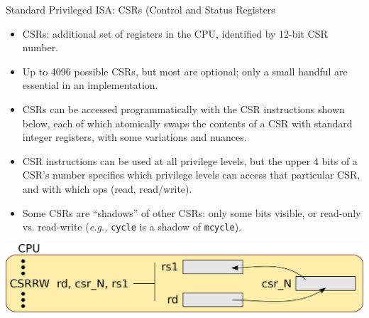 \documentclass{article}
\newcommand{\hm}{\hspace*{1em}}
\newcommand{\eg}{\emph{e.g.,}}
\begin{document}
\clearpage


\begin{center}
  {\Huge
    Standard Privileged ISA: CSRs (Control and Status Registers}

  \vspace*{0.2in}

  \begin{minipage}{9in}\Large
    \begin{itemize}

      \item CSRs: additional set of registers in the CPU, identified
        by 12-bit CSR number.

      \item Up to 4096 possible CSRs, but most are optional; only a
        small handful are essential in an implementation.

      \item CSRs can be accessed programmatically with the CSR
        instructions shown below, each of which atomically swaps the
        contents of a CSR with standard integer registers, with some
        variations and nuances.

      \item CSR instructions can be used at all privilege levels, but
        the upper 4 bits of a CSR's number specifies which privilege
        levels can access that particular CSR, and with which
        ops (read, read/write).

      \item Some CSRs are ``shadows'' of other CSRs: only some bits
        visible, or read-only vs. read-write ({\eg} {\tt cycle} is a
        shadow of {\tt mcycle}).
    \end{itemize}

    \hm

    \begin{center}

      \hm

      \includegraphics[width=7in]{Figs/CSRRW.png}
    \end{center}

  \end{minipage}
\end{center}
\end{document}
